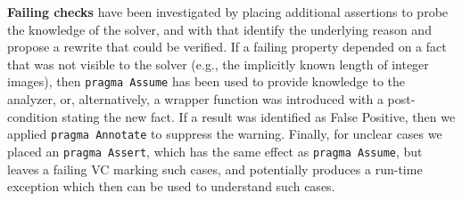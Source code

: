 
\textbf{Failing checks} have been investigated by placing additional
assertions to probe the knowledge of the solver, and with that
identify the underlying reason and propose a rewrite that could be
verified. If a failing property depended on a fact that was not
visible to the solver (e.g., the implicitly known length of integer
images), then \texttt{pragma Assume} has been used to provide
knowledge to the analyzer, or, alternatively, a wrapper function was
introduced with a post-condition stating the new fact. If a result was
identified as False Positive, then we applied \texttt{pragma Annotate}
to suppress the warning. Finally, for unclear cases we placed an
\texttt{pragma Assert}, which has the same effect as \texttt{pragma
  Assume}, but leaves a failing VC marking such cases, and potentially
produces a run-time exception which then can be used to understand
such cases.

